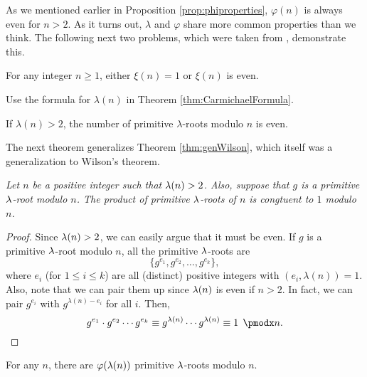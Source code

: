 \documentclass{subfile}
\begin{document}
	As we mentioned earlier in Proposition \ref{prop:phiproperties}, $\varphi(n)$ is always even for $n>2$. As it turns out, $\lambda$ and $\varphi$ share more common properties than we think. The following next two problems, which were taken from \cite{ch:congruence-primitive-lambda}, demonstrate this.
	
	\begin{problem}
		For any integer $n\geq 1$, either $\xi(n)=1$ or $\xi(n)$ is even.
	\end{problem}

	\begin{hint}
		Use the formula for $\lambda(n)$ in Theorem \ref{thm:CarmichaelFormula}.
	\end{hint}

	\begin{problem}
		If $\lambda(n)>2$, the number of primitive $\lambda$-roots modulo $n$ is even.
	\end{problem}

	

	The next theorem generalizes Theorem \ref{thm:genWilson}, which itself was a generalization to Wilson's theorem. 
	\begin{theorem}\slshape
		Let $n$ be a positive integer such that $\lambda(n)>2$. Also, suppose that $g$ is a primitive $\lambda$-root modulo $n$. The product of primitive $\lambda$-roots of $n$ is congtuent to $1$ modulo $n$.
	\end{theorem}
	
	\begin{proof}
		Since $\lambda(n)>2$, we can easily argue that it must be even. If $g$ is a primitive $\lambda$-root modulo $n$, all the primitive $\lambda$-roots are $$\{g^{e_1}, g^{e_2}, \ldots, g^{e_{k}}\},$$ where $e_i$ (for $1 \leq i \leq k$) are all (distinct) positive integers with $(e_i, \lambda(n))=1$. Also, note that we can pair them up since $\lambda(n)$ is even if $n>2$. In fact, we can pair $g^{e_i}$ with $g^{\lambda(n)-e_i}$ for all $i$. Then,
		\begin{equation*}
		g^{e_1}\cdot g^{e_2}\cdots g^{e_k}  \equiv g^{\l(n)}\cdots g^{\l(n)}  \equiv 1\pmod n. \qedhere
		\end{equation*}
	\end{proof}
	
	\begin{corollary}
		For any $n$, there are $\varphi(\lambda(n))$ primitive $\lambda$-roots modulo $n$.
	\end{corollary}
	
\end{document}

